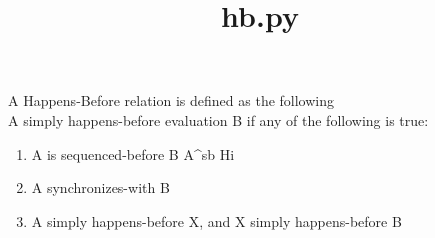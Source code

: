 \documentclass{article}
\date{}
\newcommand{\seqb}[2]{{#1}\color{Blue}\rightarrow^{sb} \color{black}{#2} }
\begin{document}
\title{hb.py}
\maketitle

A Happens-Before relation is defined as the following\\
A simply happens-before evaluation B if any of the following is true:
\begin{enumerate}
    \item A is sequenced-before B
    \newline
    \seqb{A}{B}
    Hi
    \item A synchronizes-with B
    \item A simply happens-before X, and X simply happens-before B
\end{enumerate}
\end{document}
